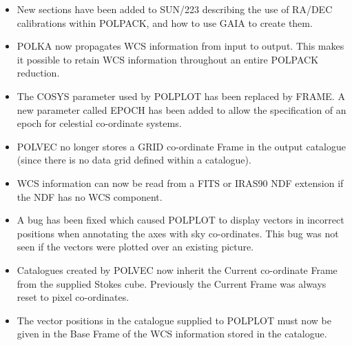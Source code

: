 \documentclass[twoside,11pt]{article}
\renewcommand{\_}{\texttt{\symbol{95}}}
\begin{document}
\begin{itemize}
\item New sections have been added to SUN/223 describing the use of
RA/DEC calibrations within POLPACK, and how to use GAIA to create them.
\item POLKA now propagates WCS information from input to output. This makes
it possible to retain WCS information throughout an entire POLPACK
reduction. 
\item The COSYS parameter used by POLPLOT has been replaced by FRAME. 
A new parameter called EPOCH has been added to allow the specification of 
an epoch for celestial co-ordinate systems.
\item POLVEC no longer stores a GRID co-ordinate Frame in the output
catalogue (since there is no data grid defined within a catalogue).
\item WCS information can now be read from a FITS or IRAS90 NDF extension
if the NDF has no WCS component.
\item A bug has been fixed which caused POLPLOT to display vectors in 
incorrect positions when annotating the axes with sky co-ordinates. This bug
was not seen if the vectors were plotted over an existing picture.
\item Catalogues created by POLVEC now inherit the Current co-ordinate Frame 
from the supplied Stokes cube. Previously the Current Frame was always reset to
pixel co-ordinates.
\item The vector positions in the catalogue supplied to POLPLOT must now
be given in the Base Frame of the WCS information stored in the catalogue.
\end{itemize}
\end{document}
